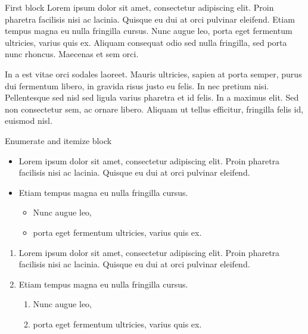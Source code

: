 \documentclass[english,xcolor=table,t]{beamer}
\begin{document}
\begin{frame}
\begin{columns}
\begin{vfillcolumn}{\colwidth}
\begin{block}{First block}
Lorem ipsum dolor sit amet, consectetur adipiscing elit. Proin pharetra facilisis nisi ac lacinia. Quisque eu dui at orci pulvinar eleifend. Etiam tempus magna eu nulla fringilla cursus. Nunc augue leo, porta eget fermentum ultricies, varius quis ex. Aliquam consequat odio sed nulla fringilla, sed porta nunc rhoncus. Maecenas et sem orci.

In a est vitae orci sodales laoreet. Mauris ultricies, sapien at porta semper, purus dui fermentum libero, in gravida risus justo eu felis. In nec pretium nisi. Pellentesque sed nisl sed ligula varius pharetra et id felis. In a maximus elit. Sed non consectetur sem, ac ornare libero. Aliquam ut tellus efficitur, fringilla felis id, euismod nisl.
\end{block}

\vfill
\begin{block}{Enumerate and itemize block}
\begin{itemize}
\item Lorem ipsum dolor sit amet, consectetur adipiscing elit. Proin pharetra facilisis nisi ac lacinia. Quisque eu dui at orci pulvinar eleifend. 

\item Etiam tempus magna eu nulla fringilla cursus. 
\begin{itemize}
\item Nunc augue leo,
\item porta eget fermentum ultricies, varius quis ex. 
\end{itemize}
\end{itemize}

\begin{enumerate}
\item Lorem ipsum dolor sit amet, consectetur adipiscing elit. Proin pharetra facilisis nisi ac lacinia. Quisque eu dui at orci pulvinar eleifend. 

\item Etiam tempus magna eu nulla fringilla cursus. 
\begin{enumerate}
\item Nunc augue leo,
\item porta eget fermentum ultricies, varius quis ex. 
\end{enumerate}
\end{enumerate}


\end{block}
\end{vfillcolumn}
\end{columns}
\end{frame}
\end{document}
